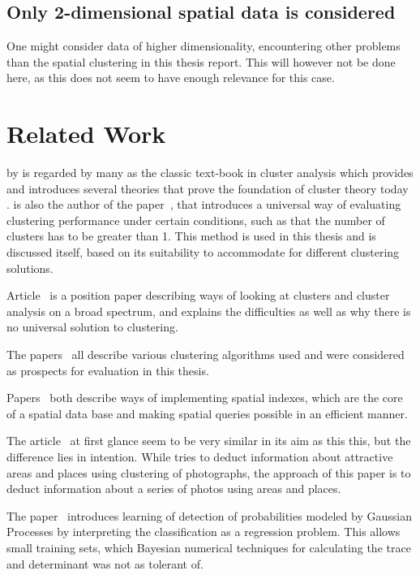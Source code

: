 \subsection{Only 2-dimensional spatial data is considered}
One might consider data of higher dimensionality, encountering
other problems than the spatial clustering in this thesis report.
This will however not be done here, as this does not seem to
have enough relevance for this case. 

\section{Related Work}
 by 
\citeauthor{finding-groups-in-data} is regarded by many as the 
classic text-book in cluster analysis which provides and 
introduces several theories that prove the foundation of 
cluster theory today \cite{finding-groups-in-data}.
\citeauthor{silhouettes} is also the author of the 
paper~\cite{silhouettes}, that introduces a universal way of 
evaluating clustering performance under certain conditions, such 
as that the number of clusters has to be greater than 1. This 
method is used in this thesis and is discussed itself, based on 
its suitability to accommodate for different clustering solutions.

Article~\cite{why-so-many-clustering-algorithms} is a position 
paper describing ways of looking at clusters and cluster analysis 
on a broad spectrum, and explains the difficulties as well as 
why there is no universal solution to clustering. 

The papers~\cite{DBSCAN, OPTICS, CLARANS, Ejcluster, SLINK, clusterpath, k-means, finding-groups-in-data} 
all describe various clustering algorithms used and were considered 
as prospects for evaluation in this thesis. 

Papers~\cite{R-trees, R*-trees} both describe ways of implementing 
spatial indexes, which are the core of a spatial data base and making 
spatial queries possible in an efficient manner. 

The article~ at first glance seem to be very similar in 
its aim as this this, but the difference lies in intention. While 
\citeauthor{P-DBSCAN} tries to deduct information about attractive
areas and places using clustering of photographs, the approach of this 
paper is to deduct information about a series of photos using areas 
and places. \cite{P-DBSCAN}

The paper~\cite{bayesian-class-gauss-proc} introduces learning of detection of 
probabilities modeled by Gaussian Processes by interpreting the 
classification as a regression problem. This allows small training 
sets, which Bayesian numerical techniques for calculating the trace 
and determinant was not as tolerant of. 

